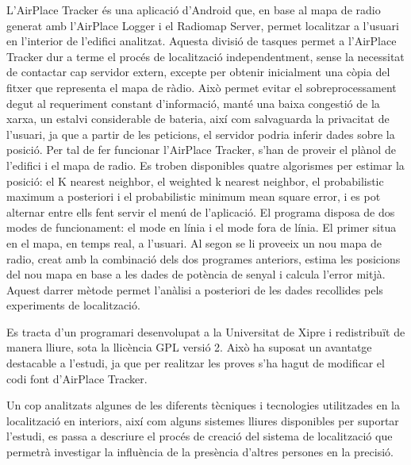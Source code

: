 L'AirPlace Tracker és una aplicació d'Android que, en base al mapa de radio generat amb l'AirPlace Logger i el Radiomap Server, permet localitzar a l'usuari en l'interior de l'edifici analitzat. Aquesta divisió de tasques permet a l'AirPlace Tracker dur a terme el procés de localització independentment, sense la necessitat de contactar cap servidor extern, excepte per obtenir inicialment una còpia del fitxer que representa el mapa de ràdio. Això permet evitar el sobreprocessament degut al requeriment constant d'informació, manté una baixa congestió de la xarxa, un estalvi considerable de bateria, així com salvaguarda la privacitat de l'usuari, ja que a partir de les peticions, el servidor podria inferir dades sobre la posició.
Per tal de fer funcionar l'AirPlace Tracker, s'han de proveir el plànol de l'edifici i el mapa de radio. Es troben disponibles quatre algorismes per estimar la posició: el K nearest neighbor, el weighted k nearest neighbor, el probabilistic maximum a posteriori i el probabilistic minimum mean square error, i es pot alternar entre ells fent servir el menú de l'aplicació.
El programa disposa de dos modes de funcionament: el mode en línia i el mode fora de línia. El primer situa en el mapa, en temps real, a l'usuari. Al segon se li proveeix un nou mapa de radio, creat amb la combinació dels dos programes anteriors, estima les posicions del nou mapa en base a les dades de potència de senyal i calcula l'error mitjà. Aquest darrer mètode permet l'anàlisi a posteriori de les dades recollides pels experiments de localització.

Es tracta d'un programari desenvolupat a la Universitat de Xipre i redistribuït de manera lliure, sota la llicència GPL versió 2. Això ha suposat un avantatge destacable a l'estudi, ja que per realitzar les proves s'ha hagut de modificar el codi font d'AirPlace Tracker.

Un cop analitzats algunes de les diferents tècniques i tecnologies utilitzades en la localització en interiors, així com alguns sistemes lliures disponibles per suportar l'estudi, es passa a descriure el procés de creació del sistema de localització que permetrà investigar la influència de la presència d'altres persones en la precisió.

